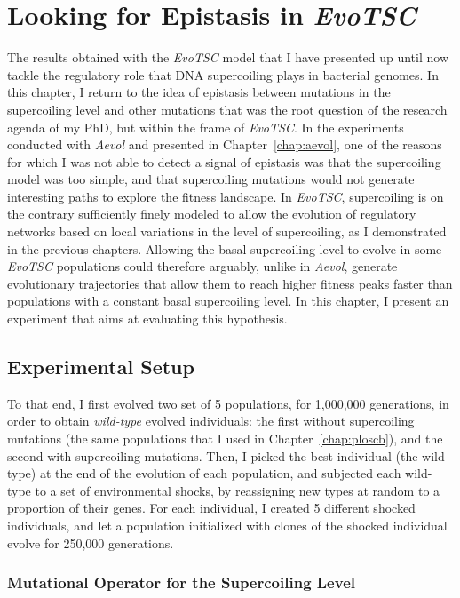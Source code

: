 \chapter{Looking for Epistasis in \emph{EvoTSC}}

The results obtained with the \emph{EvoTSC} model that I have presented up until now tackle the regulatory role that DNA supercoiling plays in bacterial genomes.
In this chapter, I return to the idea of epistasis between mutations in the supercoiling level and other mutations that was the root question of the research agenda of my PhD, but within the frame of \emph{EvoTSC}.
In the experiments conducted with \emph{Aevol} and presented in Chapter~\ref{chap:aevol}, one of the reasons for which I was not able to detect a signal of epistasis was that the supercoiling model was too simple, and that supercoiling mutations would not generate interesting paths to explore the fitness landscape.
In \emph{EvoTSC}, supercoiling is on the contrary sufficiently finely modeled to allow the evolution of regulatory networks based on local variations in the level of supercoiling, as I demonstrated in the previous chapters.
Allowing the basal supercoiling level to evolve in some \emph{EvoTSC} populations could therefore arguably, unlike in \emph{Aevol}, generate evolutionary trajectories that allow them to reach higher fitness peaks faster than populations with a constant basal supercoiling level.
In this chapter, I present an experiment that aims at evaluating this hypothesis.

\section{Experimental Setup}

To that end, I first evolved two set of 5 populations, for 1,000,000 generations, in order to obtain \emph{wild-type} evolved individuals: the first without supercoiling mutations (the same populations that I used in Chapter~\ref{chap:ploscb}), and the second with supercoiling mutations.
Then, I picked the best individual (the wild-type) at the end of the evolution of each population, and subjected each wild-type to a set of environmental shocks, by reassigning new types at random to a proportion of their genes.
For each individual, I created 5 different shocked individuals, and let a population initialized with clones of the shocked individual evolve for 250,000 generations.

\subsection{Mutational Operator for the Supercoiling Level}

